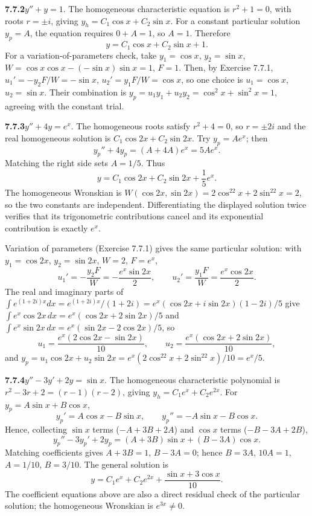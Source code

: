 \par\bigskip
\noindent\textbf{7.7.2}\quad $y''+y=1$.
\solution
The homogeneous characteristic equation is $r^2+1=0$, with roots
$r=\pm i$, giving $y_h=C_1\cos x+C_2\sin x$. For a constant particular
solution $y_p=A$, the equation requires $0+A=1$, so $A=1$. Therefore
\[
\boxed{y=C_1\cos x+C_2\sin x+1}.
\]
For a variation-of-parameters check, take $y_1=\cos x$, $y_2=\sin x$,
$W=\cos x\cos x-(-\sin x)\sin x=1$, $F=1$. Then, by Exercise 7.7.1,
$u_1'=-y_2F/W=-\sin x$, $u_2'=y_1F/W=\cos x$, so one choice is
$u_1=\cos x$, $u_2=\sin x$. Their combination is
$y_p=u_1y_1+u_2y_2=\cos^2x+\sin^2x=1$, agreeing with the constant trial.

\par\bigskip
\noindent\textbf{7.7.3}\quad $y''+4y=e^{x}$.
\solution
The homogeneous roots satisfy $r^2+4=0$, so $r=\pm2i$ and the real
homogeneous solution is $C_1\cos2x+C_2\sin2x$. Try $y_p=Ae^x$; then
\[
y_p''+4y_p=(A+4A)e^x=5Ae^x.
\]
Matching the right side sets $A=1/5$. Thus
\[
\boxed{y=C_1\cos2x+C_2\sin2x+\frac15e^x}.
\]
The homogeneous Wronskian is
$W(\cos2x,\sin2x)=2\cos^22x+2\sin^22x=2$, so the two constants are
independent. Differentiating the displayed solution twice verifies that
its trigonometric contributions cancel and its exponential contribution
is exactly $e^x$.

Variation of parameters (Exercise 7.7.1) gives the same particular
solution: with $y_1=\cos2x$, $y_2=\sin2x$, $W=2$, $F=e^x$,
\[
u_1'=-\frac{y_2F}W=-\frac{e^x\sin2x}2,\qquad
u_2'=\frac{y_1F}W=\frac{e^x\cos2x}2.
\]
The real and imaginary parts of
$\int e^{(1+2i)x}dx=e^{(1+2i)x}/(1+2i)=e^x(\cos2x+i\sin2x)(1-2i)/5$
give $\int e^x\cos2x\,dx=e^x(\cos2x+2\sin2x)/5$ and
$\int e^x\sin2x\,dx=e^x(\sin2x-2\cos2x)/5$, so
\[
u_1=\frac{e^x(2\cos2x-\sin2x)}{10},\qquad
u_2=\frac{e^x(\cos2x+2\sin2x)}{10},
\]
and $y_p=u_1\cos2x+u_2\sin2x=e^x(2\cos^22x+2\sin^22x)/10=e^x/5$.

\par\bigskip
\noindent\textbf{7.7.4}\quad $y''-3y'+2y=\sin x$.
\solution
The homogeneous characteristic polynomial is
$r^2-3r+2=(r-1)(r-2)$, giving $y_h=C_1e^x+C_2e^{2x}$.
For $y_p=A\sin x+B\cos x$,
\[
y_p'=A\cos x-B\sin x,\qquad y_p''=-A\sin x-B\cos x.
\]
Hence, collecting $\sin x$ terms ($-A+3B+2A$) and $\cos x$ terms
($-B-3A+2B$),
\[
y_p''-3y_p'+2y_p=(A+3B)\sin x+(B-3A)\cos x.
\]
Matching coefficients gives $A+3B=1$, $B-3A=0$; hence
$B=3A$, $10A=1$, $A=1/10$, $B=3/10$. The general solution is
\[
\boxed{y=C_1e^x+C_2e^{2x}+\frac{\sin x+3\cos x}{10}}.
\]
The coefficient equations above are also a direct residual check of the
particular solution; the homogeneous Wronskian is $e^{3x}\ne0$.

